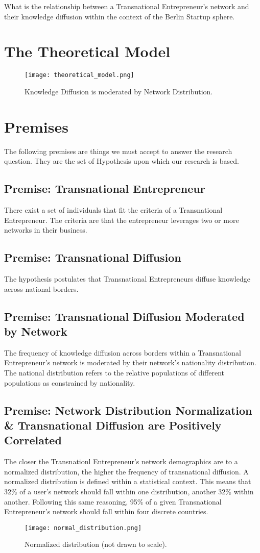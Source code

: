 What is the relationship between a Transnational Entrepreneur's network and their knowledge diffusion within the context of the Berlin Startup sphere.
\section{The Theoretical Model}
\begin{figure}[!ht]
  \centering
  \texttt{[image: theoretical\_model.png]}
  \caption{Knowledge Diffusion is moderated by Network Distribution.}
\end{figure}

\section{Premises}
The following premises are things we must accept to answer the research question. They are the set of Hypothesis upon which our research is based.
\subsection{Premise: Transnational Entrepreneur}
There exist a set of individuals that fit the criteria of a Transnational Entrepreneur. The criteria are that the entrepreneur leverages two or more networks in their business. 
\subsection{Premise: Transnational Diffusion}
The hypothesis postulates that Transnational Entrepreneurs diffuse knowledge across national borders.
\subsection{Premise: Transnational Diffusion Moderated by Network}
The frequency of knowledge diffusion across borders within a Transnational Entrepreneur's network is moderated by their network's nationality distribution. The national distribution refers to the relative populations of different populations as constrained by nationality.
\subsection{Premise: Network Distribution Normalization \& Transnational Diffusion are Positively Correlated}
The closer the Transnationl Entrepreneur's network demographics are to a normalized distribution, the higher the frequency of transnational diffusion. A normalized distribution is defined within a statistical context. This means that 32\% of a user's network should fall within one distribution, another 32\% within another. Following this same reasoning, 95\% of a given Transnational Entrepreneur's network should fall within four discrete countries.
\begin{figure}[!ht]
  \centering
  \texttt{[image: normal\_distribution.png]}
  \caption{Normalized distribution (not drawn to scale).}
\end{figure}

